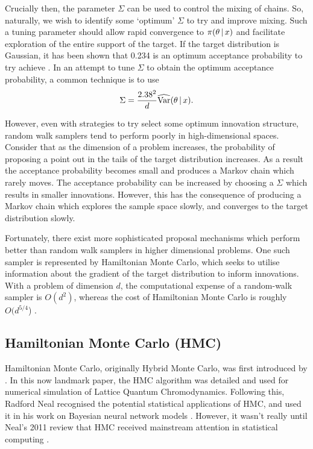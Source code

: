 Crucially then, the parameter $\Sigma$ can be used to control the mixing of chains. So,
naturally, we wish to identify some `optimum' $\Sigma$ to try and improve mixing. Such a
tuning parameter should allow rapid convergence to $\pi(\theta \,|\,  x)$ and
facilitate exploration of the entire support of the target. If the target distribution is
Gaussian, it has been shown that 0.234 is an optimum acceptance probability to try achieve
\parencite{roberts01}. In an attempt to tune $\Sigma$ to obtain the optimum acceptance
probability, a common technique is to use
\begin{equation*}
  \Sigma = \frac{2.38^2}{d} \widehat{\text{Var}}(\theta \,|\, x).
\end{equation*}

However, even with strategies to try select some optimum innovation structure, random walk
samplers tend to perform poorly in high-dimensional spaces. Consider that as the
dimension of a problem increases, the probability of proposing a point out in the tails of
the target distribution increases. As a result the acceptance probability becomes small and
produces a Markov chain which rarely moves. The acceptance probability can be increased
by choosing a $\Sigma$ which results in smaller innovations. However, this has the
consequence of producing a Markov chain which explores the sample space slowly, and
converges to the target distribution slowly.

Fortunately, there exist more sophisticated proposal mechanisms which perform better than
random walk samplers in higher dimensional problems. One such sampler is represented by
Hamiltonian Monte Carlo, which seeks to utilise information about the gradient of the
target distribution to inform innovations. With a problem of dimension $d$, the
computational expense of a random-walk sampler is $O(d^2)$, whereas the cost of
Hamiltonian Monte Carlo is roughly $O(d^{5/4}$) \parencite{creutz88}. 

\subsection{Hamiltonian Monte Carlo (HMC)}

Hamiltonian Monte Carlo, originally Hybrid Monte Carlo, was first introduced by
\textcite{duane87}. In this now landmark paper, the HMC algorithm was detailed and used
for numerical simulation of Lattice Quantum Chromodynamics. Following this, Radford Neal
recognised the potential statistical applications of HMC, and used it in his work on
Bayesian neural network models \parencite{neal95}. However, it wasn't really until Neal's
2011 review \parencite{neal11} that HMC received mainstream attention in statistical
computing \parencite{betancourt18}.

